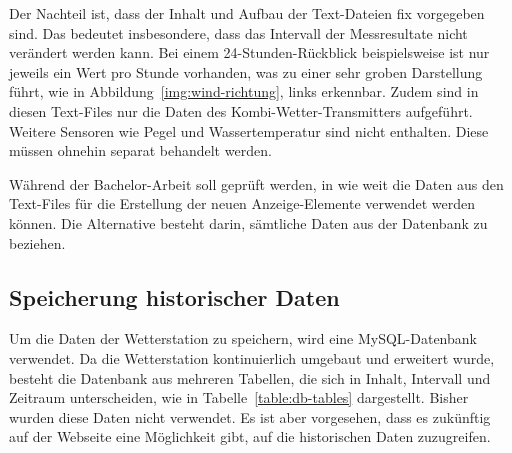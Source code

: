 \noindent
Der Nachteil ist, dass der Inhalt und Aufbau der Text-Dateien fix vorgegeben sind. Das bedeutet insbesondere, dass das Intervall der Messresultate nicht verändert werden kann. Bei einem 24-Stunden-Rückblick beispielsweise ist nur jeweils ein Wert pro Stunde vorhanden, was zu einer sehr groben Darstellung führt, wie in Abbildung~\ref{img:wind-richtung}, links erkennbar. Zudem sind in diesen Text-Files nur die Daten des Kombi-Wetter-Transmitters aufgeführt. Weitere Sensoren wie Pegel und Wassertemperatur sind nicht enthalten. Diese müssen ohnehin separat behandelt werden.
\newline

\noindent
Während der Bachelor-Arbeit soll geprüft werden, in wie weit die Daten aus den Text-Files für die Erstellung der neuen Anzeige-Elemente verwendet werden können. Die Alternative besteht darin, sämtliche Daten aus der Datenbank zu beziehen.


\subsection{Speicherung historischer Daten}
Um die Daten der Wetterstation zu speichern, wird eine MySQL-Datenbank verwendet. Da die Wetterstation kontinuierlich umgebaut und erweitert wurde, besteht die Datenbank aus mehreren Tabellen, die sich in Inhalt, Intervall und Zeitraum unterscheiden, wie in Tabelle~\ref{table:db-tables} dargestellt. Bisher wurden diese Daten nicht verwendet. Es ist aber vorgesehen, dass es zukünftig auf der Webseite eine Möglichkeit gibt, auf die historischen Daten zuzugreifen.
\newline

\begin{table}[h!]
\caption{Vorhandene Daten in der Datenbank}
\label{table:db-tables}
\end{table}

